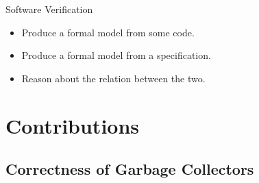 \documentclass[usenames,dvipsnames]{beamer}
\begin{document}
\begin{frame}{Software Verification}
  \begin{itemize}
  \item Produce a formal model from some code.
  \item Produce a formal model from a specification.
  \item Reason about the relation between the two.
  \end{itemize}



\end{frame}


\section{Contributions}
\subsection{Correctness of Garbage Collectors}
\end{document}
